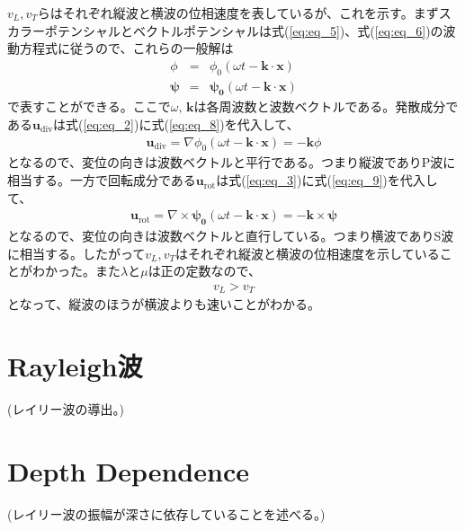 $v_{L},v_{T}$らはそれぞれ縦波と横波の位相速度を表しているが、これを示す。まずスカラーポテンシャルとベクトルポテンシャルは式(\ref{eq:eq_5})、式(\ref{eq:eq_6})の波動方程式に従うので、これらの一般解は
\begin{eqnarray}
  \phi &=& \phi_{0}(\omega{t}-\bm{k}\cdot{\bm{x}}) \label{eq:eq_8}\\
  \bm{\psi} &=& \bm{\psi_{0}}(\omega{t}-\bm{k}\cdot{\bm{x}}) \label{eq:eq_9}
\end{eqnarray}
で表すことができる。ここで$\omega,\,\bm{k}$は各周波数と波数ベクトルである。発散成分である$\bm{u}_{\mathrm{div}}$は式(\ref{eq:eq_2})に式(\ref{eq:eq_8})を代入して、
\begin{eqnarray}
  \bm{u}_{\mathrm{div}} = \nabla{\phi_{0}(\omega{t}-\bm{k}\cdot{\bm{x}})} =-\bm{k}{\phi}
\end{eqnarray}
となるので、変位の向きは波数ベクトルと平行である。つまり縦波でありP波に相当する。一方で回転成分である$\bm{u}_{\mathrm{rot}}$は式(\ref{eq:eq_3})に式(\ref{eq:eq_9})を代入して、
\begin{eqnarray}
  \bm{u}_{\mathrm{rot}} = \nabla\times{\bm{\psi_{0}}(\omega{t}-\bm{k}\cdot{\bm{x}})} =-\bm{k}\times{\bm{\psi}}
\end{eqnarray}
となるので、変位の向きは波数ベクトルと直行している。つまり横波でありS波に相当する。したがって$v_{L},v_{T}$はそれぞれ縦波と横波の位相速度を示していることがわかった。また$\lambda$と$\mu$は正の定数なので、
\begin{eqnarray}
  v_{L} > v_{T}
\end{eqnarray}
となって、縦波のほうが横波よりも速いことがわかる。




\section{Rayleigh波} %
(レイリー波の導出。)

\section{Depth Dependence}
(レイリー波の振幅が深さに依存していることを述べる。)
